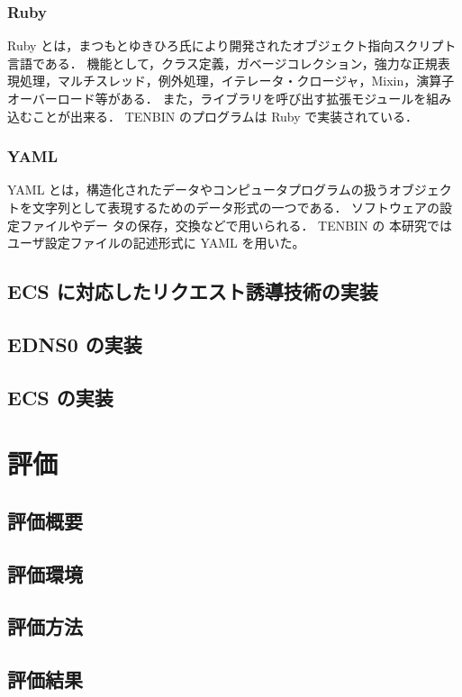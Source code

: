 \documentclass[a4j,12pt,onecolumn,oneside,titlepage,openany,final]{jreport}
\begin{document}
\subsection{Ruby}
Ruby\cite{ruby} とは，まつもとゆきひろ氏により開発されたオブジェクト指向スクリプト言語である．
機能として，クラス定義，ガベージコレクション，強力な正規表現処理，マルチスレッド，例外処理，イテレータ・クロージャ，Mixin，演算子オーバーロード等がある．
また，ライブラリを呼び出す拡張モジュールを組み込むことが出来る．
TENBIN のプログラムは Ruby で実装されている．

\subsection{YAML}
YAML\cite{yaml} とは，構造化されたデータやコンピュータプログラムの扱うオブジェクトを文字列として表現するためのデータ形式の一つである．
ソフトウェアの設定ファイルやデー タの保存，交換などで用いられる．
TENBIN の
本研究ではユーザ設定ファイルの記述形式に YAML を用いた。


\section{ECS に対応したリクエスト誘導技術の実装}
\section{EDNS0 の実装}
\section{ECS の実装}

\chapter{評価}\label{chap:Evaluation}
\section{評価概要}
\section{評価環境}
\section{評価方法}
\section{評価結果}
\end{document}
